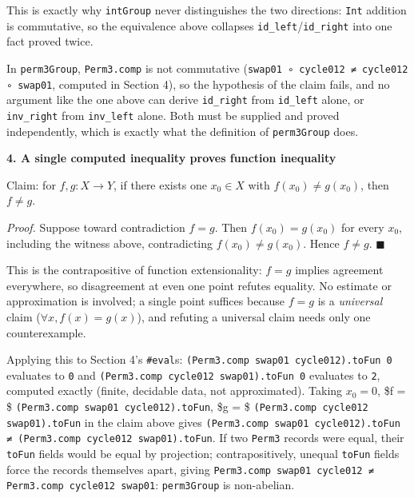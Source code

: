 This is exactly why \texttt{intGroup} never distinguishes the two directions: \texttt{Int} addition is commutative, so the equivalence above collapses \texttt{id\_\allowbreak{}left}/\texttt{id\_\allowbreak{}right} into one fact proved twice.

In \texttt{perm3Group}, \texttt{Perm3.comp} is not commutative (\texttt{swap01 ∘ cycle012 ≠ cycle012 ∘ swap01}, computed in Section 4), so the hypothesis of the claim fails, and no argument like the one above can derive \texttt{id\_\allowbreak{}right} from \texttt{id\_\allowbreak{}left} alone, or \texttt{inv\_\allowbreak{}right} from \texttt{inv\_\allowbreak{}left} alone. Both must be supplied and proved independently, which is exactly what the definition of \texttt{perm3Group} does.

\textbf{4. A single computed inequality proves function inequality}

Claim: for \(f, g : X \to Y\), if there exists one \(x_0 \in X\) with \(f(x_0) \neq g(x_0)\), then \(f \neq g\).

\emph{Proof.} Suppose toward contradiction \(f = g\). Then \(f(x_0) = g(x_0)\) for every \(x_0\), including the witness above, contradicting \(f(x_0) \neq
g(x_0)\). Hence \(f \neq g\). \(\blacksquare\)

This is the contrapositive of function extensionality: \(f = g\) implies agreement everywhere, so disagreement at even one point refutes equality. No estimate or approximation is involved; a single point suffices because \(f = g\) is a \emph{universal} claim (\(\forall x, f(x) = g(x)\)), and refuting a universal claim needs only one counterexample.

Applying this to Section 4's \texttt{\#eval}s: \texttt{(Perm3.comp swap01 cycle012).toFun 0} evaluates to \texttt{0} and \texttt{(Perm3.comp cycle012 swap01).toFun 0} evaluates to \texttt{2}, computed exactly (finite, decidable data, not approximated). Taking \(x_0 = 0\), \$f = \$ \texttt{(Perm3.comp swap01 cycle012).toFun}, \$g = \$ \texttt{(Perm3.comp cycle012 swap01).toFun} in the claim above gives \texttt{(Perm3.comp swap01 cycle012).toFun ≠ (Perm3.comp cycle012 swap01).toFun}. If two \texttt{Perm3} records were equal, their \texttt{toFun} fields would be equal by projection; contrapositively, unequal \texttt{toFun} fields force the records themselves apart, giving \texttt{Perm3.comp swap01 cycle012 ≠ Perm3.comp cycle012 swap01}: \texttt{perm3Group} is non-abelian.
